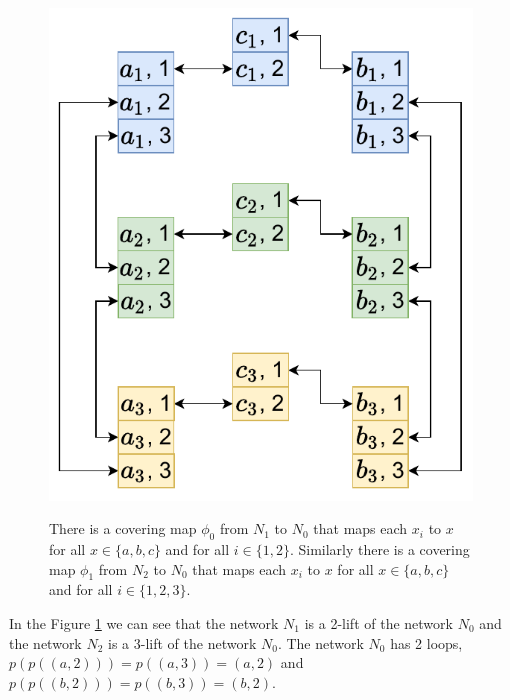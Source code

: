 \begin{figure}[H]
{    \includegraphics[scale=0.46]{diagrams/covering_map_5c.pdf}
  }
  \caption{
    There is a covering map $\phi_0$ from $N_1$ to $N_0$ that maps each $x_i$ to $x$ for all $x \in \{a, b, c\}$ and for all $i \in \{1, 2\}$.
    Similarly there is a covering map $\phi_1$ from $N_2$ to $N_0$ that maps each $x_i$ to $x$ for all $x \in \{a, b, c\}$ and for all $i \in \{1, 2, 3\}$.
  }
  \label{fig:covering_map3}
\end{figure}

In the Figure \ref{fig:covering_map3} we can see that the network $N_1$ is a 2-lift of the network $N_0$ and the network $N_2$ is a 3-lift of the network $N_0$.
The network $N_0$ has 2 loops, $p(p((a, 2))) = p((a, 3)) = (a, 2)$ and $p(p((b, 2))) = p((b, 3)) = (b, 2)$.




